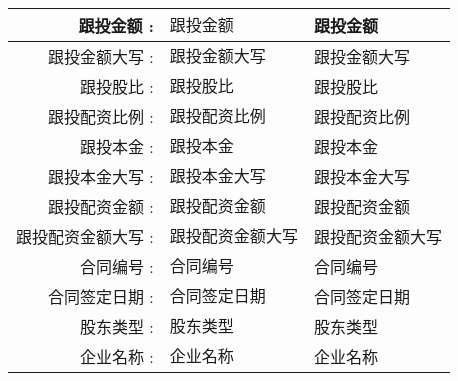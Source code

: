 \documentclass[12pt, letterpaper, twoside]{ctexart}
\begin{document}
\begin{longtable}[1\textwidth]{ |r|p{}|l| }
跟投金额 :& $跟投金额$ & 跟投金额 \\
\hline
跟投金额大写 :& $跟投金额大写$ & 跟投金额大写 \\
\hline
跟投股比 :& $跟投股比$ & 跟投股比 \\
\hline
跟投配资比例 :& $跟投配资比例$ & 跟投配资比例 \\
\hline
跟投本金 :& $跟投本金$ & 跟投本金 \\
\hline
跟投本金大写 :& $跟投本金大写$ & 跟投本金大写 \\
\hline
跟投配资金额 :& $跟投配资金额$ & 跟投配资金额 \\
\hline
跟投配资金额大写 :& $跟投配资金额大写$ & 跟投配资金额大写 \\
\hline
合同编号 :& $合同编号$ & 合同编号 \\
\hline
合同签定日期 :& $合同签定日期$ & 合同签定日期 \\
\hline
股东类型 :& $股东类型$ & 股东类型 \\
\hline
企业名称 :& $企业名称$ & 企业名称 \\
\hline
\end{longtable}
\end{document}
